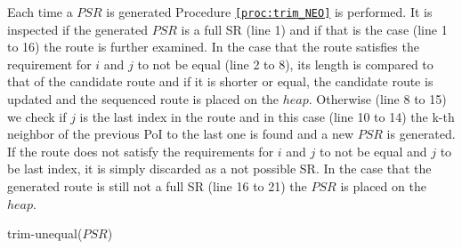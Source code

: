 \pagebreak

Each time a $PSR$ is generated Procedure \texttt{\ref{proc:trim_NEO}} is performed. It is inspected if the generated $PSR$ is a full SR (line 1) and if that is the case (line 1 to 16) the route is further examined. In the case that the route satisfies the requirement for $i$ and $j$ to not be equal (line 2 to 8), its length is compared to that of the candidate route and if it is shorter or equal, the candidate route is updated and the sequenced route is placed on the $heap$. Otherwise (line 8 to 15) we check if $j$ is the last index in the route and in this case (line 10 to 14) the k-th neighbor of the previous PoI to the last one is found and a new $PSR$ is generated. If the route does not satisfy the requirements for $i$ and $j$ to not be equal and $j$ to be last index, it is simply discarded as a not possible SR. In the case that the generated route is still not a full SR (line 16 to 21) the $PSR$ is placed on the $heap$. \newline

\begin{procedure}[H]
\caption{trim-unequal($PSR$)}
\label{proc:trim_NEO}
	
\end{procedure}

